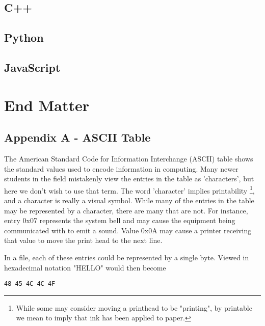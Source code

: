 \documentclass[11pt,fleqn]{book} %
\begin{document}
\chapter{C++}

\chapter{Python}

\chapter{JavaScript}
\part{End Matter}
\chapter*{Appendix A - ASCII Table}
\newcommand*{\thead}[1]{\multicolumn{1}{c}{\bfseries #1}}

The American Standard Code for Information Interchange (ASCII) table shows the standard values used to encode information in computing.  Many newer students in the field mistakenly view the entries in the table as 'characters', but here we don't wish to use that term.  The word 'character' implies printability \footnote{While some may consider moving a printhead to be "printing", by printable we mean to imply that ink has been applied to paper.}, and a character is really a visual symbol.  While many of the entries in the table may be represented by a character, there are many that are not.  For instance, entry 0x07 represents the system bell and may cause the equipment being communicated with to emit a sound.  Value 0x0A may cause a printer receiving that value to move the print head to the next line.

In a file, each of these entries could be represented by a single byte.  Viewed in hexadecimal notation "HELLO" would then become

\begin{verbatim}
48 45 4C 4C 4F
\end{verbatim}
\end{document}
